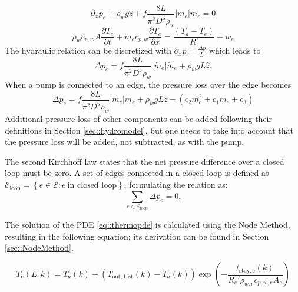 \begin{equation}\label{eq::formom}
\partial_x p_e + \rho_w g \hat{z} + f\frac{8 L}{\pi^2 D^5 \rho_w} |\dot{m}_e|\dot{m}_e =0
\end{equation}
\begin{equation}\label{eq::forsimpipePDE}
\rho_w c_{p,w} A \frac{\partial T_e}{\partial t} + \dot{m}_e c_{p,w} \frac{\partial T_e}{\partial x}=\frac{\left(T_a-T_e\right)}{R'} + w_e
\end{equation}
The hydraulic relation can be discretized with $\partial_x p = \frac{\Delta p}{L}$ which leads to
\begin{equation}\label{eq::thermopde}
    \Delta p_e = f\frac{8 L}{\pi^2 D^5 \rho_w} |\dot{m}_e|\dot{m}_e + \rho_w g L \hat{z}.
\end{equation}
When a pump is connected to an edge, the pressure loss over the edge becomes
\begin{equation}
    \Delta p_e = f\frac{8 L}{\pi^2 D^5 \rho_w} |\dot{m}_e|\dot{m}_e + \rho_w g L \hat{z} - (c_2 \dot{m}_e^{2} + c_1 \dot{m}_e + c_3)
\end{equation}
Additional pressure loss of other components can be added following their definitions in Section \ref{sec::hydromodel}, but one needs to take into account that the pressure loss will be added, not subtracted, as with the pump.

The second Kirchhoff law states that the net pressure difference over a closed loop must be zero. A set of edges connected in a closed loop is defined as $\mathcal{E}_{\text{loop}} = \left\{e \in \mathcal{E}: e \ \text{in closed loop}\right\}$, formulating the relation as:
\begin{equation}\label{eq::secondKirchhoff}
    \sum_{e  \in \mathcal{E}_{\text{loop}}} \Delta p_e = 0.
\end{equation}

The solution of the PDE \eqref{eq::thermopde} is calculated using the Node Method, resulting in the following equation; its derivation can be found in Section \ref{sec::NodeMethod}. 

\begin{equation}
    T_e(L,k) = T_a(k) + \left(T_{\mathrm{out},1,\mathrm{st}}(k)
    - T_a(k)\right)\exp\!\left(-\frac{t_{\mathrm{stay,e}}(k)}{R_e'\rho_{w,e} c_{p,w,e} A_e}\right)
\end{equation}

